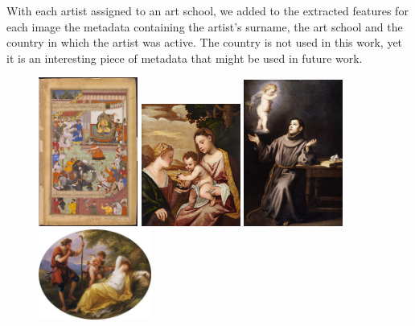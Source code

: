 \documentclass[11pt,a4paper,twoside,openright]{report}
\begin{document}
With each artist assigned to an art school, we added to the extracted features
for each image the metadata containing the artist's surname, the art school and
the country in which the artist was active.  The country is not used in this
work, yet it is an interesting piece of metadata that might be used in future
work.

\begin{figure}[tbp]
\centering
\includegraphics[width=0.29\textwidth]{basawan_2009BX3686}
\includegraphics[width=0.29\textwidth]{titian_eu_741}
\includegraphics[width=0.29\textwidth]{murillo_1974p24}
\includegraphics[width=0.33\textwidth]{kauffmann_va_pc_2006an1773}

\end{figure}
\end{document}
